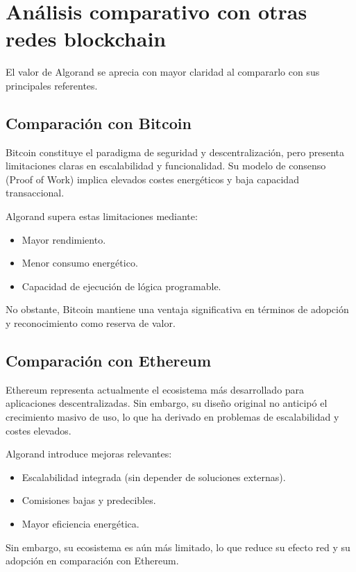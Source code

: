 \documentclass[12pt]{article}
\begin{document}
\section{Análisis comparativo con otras redes blockchain}

El valor de Algorand se aprecia con mayor claridad al compararlo con sus principales referentes.

\subsection{Comparación con Bitcoin}

Bitcoin constituye el paradigma de seguridad y descentralización, pero presenta limitaciones claras en escalabilidad y funcionalidad. Su modelo de consenso (Proof of Work) implica elevados costes energéticos y baja capacidad transaccional.

Algorand supera estas limitaciones mediante:
\begin{itemize}
    \item Mayor rendimiento.
    \item Menor consumo energético.
    \item Capacidad de ejecución de lógica programable.
\end{itemize}

No obstante, Bitcoin mantiene una ventaja significativa en términos de adopción y reconocimiento como reserva de valor.

\subsection{Comparación con Ethereum}

Ethereum representa actualmente el ecosistema más desarrollado para aplicaciones descentralizadas. Sin embargo, su diseño original no anticipó el crecimiento masivo de uso, lo que ha derivado en problemas de escalabilidad y costes elevados.

Algorand introduce mejoras relevantes:
\begin{itemize}
    \item Escalabilidad integrada (sin depender de soluciones externas).
    \item Comisiones bajas y predecibles.
    \item Mayor eficiencia energética.
\end{itemize}

Sin embargo, su ecosistema es aún más limitado, lo que reduce su efecto red y su adopción en comparación con Ethereum.
\end{document}
